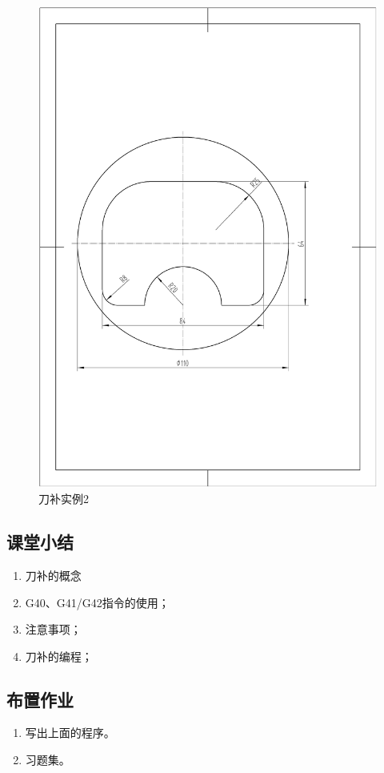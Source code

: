 \begin{figure}[h]
	\centering
	\includegraphics[width=0.8\linewidth,trim=40 150 70 220,clip]{data/image/7-2.jpg}
	\caption{刀补实例2}
	\label{fig:7-3}
\end{figure}


\subsection{课堂小结}
\begin{enumerate}[1、]
\item 刀补的概念
\item G40、G41/G42指令的使用；
\item 注意事项；
\item 刀补的编程；
\end{enumerate}

\vfill
\subsection{布置作业}
\begin{enumerate}[1、]
	\item 写出上面的程序。
	\item 习题集。
\end{enumerate}
\vfill